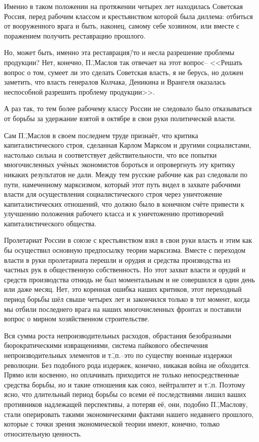 Именно в таком положении на протяжении четырех лет находилась Советская Россия, перед рабочим классом и крестьянством которой была диллема: отбиться от вооруженного врага и быть, наконец, самому себе хозяином, или вместе с поражением получить реставрацию прошлого.

Но, может быть, именно эта реставрация\=/то и несла разрешение проблемы продукции? Нет, конечно, П.\=,Маслов так отвечает на этот вопрос\--- <<Решать вопрос о том, сумеет ли это сделать Советская власть, я не берусь, но должен заметить, что власть генералов Колчака, Деникина и Врангеля оказалась неспособной разрешить проблему продукции>>.

А раз так, то тем более рабочему классу России не следовало было отказываться от борьбы за удержание взятой в октябре в свои руки политической власти.

Сам П.\=,Маслов в своем последнем труде признаёт, что критика капиталистического строя, сделанная Карлом Марксом и другими социалистами, настолько сильна и соответствует действительности, что все попытки многочисленных учёных экономистов бороться и опровергнуть эту критику никаких результатов не дали. Между тем русские рабочие как раз следовали по пути, намеченному марксизмом, который этот путь видел в захвате рабочими власти для осуществления социалистического строя через уничтожение капиталистических отношений, что должно было в конечном счёте привести к улучшению положения рабочего класса и к уничтожению противоречий капиталистического общества.

Пролетариат России в союзе с крестьянством взял в свои руки власть и этим как бы осуществил основную предпосылку теории марксизма. Вместе с переходом власти в руки пролетариата перешли и орудия и средства производства из частных рук в общественную собственность. Но этот захват власти и орудий и средств производства отнюдь не был моментальным и не совершился в один день или даже месяц. Нет, это коренная ошибка наших критиков, этот переходный период борьбы шёл свыше четырех лет и закончился только в тот момент, когда мы отбили последнего врага на наших многочисленных фронтах и поставили вопрос о мирном хозяйственном строительстве.

Вся сумма роста непроизводительных расходов, обрастания безобразными бюрократическими извращениями, система пайкового обеспечения непроизводительных элементов и т.\=,п.\---это по существу военные издержки революции. Без подобного рода издержек, конечно, никакая война не обходится. Прямо или косвенно, но оплачивать приходится не только непосредственные средства борьбы, но и такие отношения как союз, нейтралитет и т.\=,п. Поэтому ясно, что длительный период борьбы со всеми её последствиями лишил ваших противников надлежащей перспективы, а потеряв её, они, подобно П.\=,Маслову, стали оперировать такими экономическими фактами нашего недавнего прошлого, которые с точки зрения экономической теории имеют, конечно, только относительную ценность.

